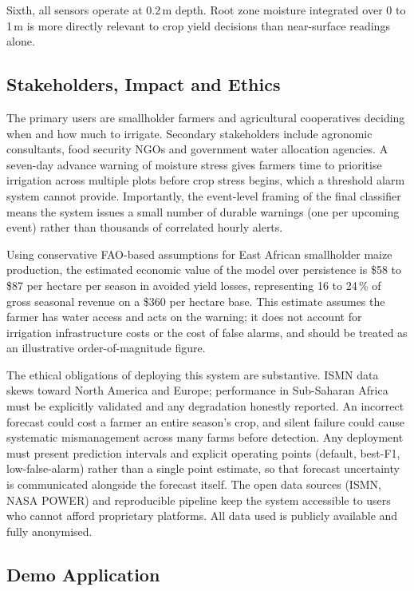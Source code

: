 \documentclass[12pt, a4paper]{article}
\begin{document}
Sixth, all sensors operate at 0.2\,m depth. Root zone moisture integrated over
0 to 1\,m is more directly relevant to crop yield decisions than near-surface
readings alone.

\subsection{Stakeholders, Impact and Ethics}

The primary users are smallholder farmers and agricultural cooperatives
deciding when and how much to irrigate. Secondary stakeholders include
agronomic consultants, food security NGOs and government water allocation
agencies. A seven-day advance warning of moisture stress gives farmers time
to prioritise irrigation across multiple plots before crop stress begins,
which a threshold alarm system cannot provide. Importantly, the event-level
framing of the final classifier means the system issues a small number of
durable warnings (one per upcoming event) rather than thousands of correlated
hourly alerts.

Using conservative FAO-based assumptions for East African smallholder maize
production, the estimated economic value of the model over persistence is
\$58 to \$87 per hectare per season in avoided yield losses, representing
16 to 24\,\% of gross seasonal revenue on a \$360 per hectare base. This
estimate assumes the farmer has water access and acts on the warning; it does
not account for irrigation infrastructure costs or the cost of false alarms,
and should be treated as an illustrative order-of-magnitude figure.

The ethical obligations of deploying this system are substantive. ISMN data
skews toward North America and Europe; performance in Sub-Saharan Africa must
be explicitly validated and any degradation honestly reported. An incorrect
forecast could cost a farmer an entire season's crop, and silent failure could
cause systematic mismanagement across many farms before detection. Any
deployment must present prediction intervals and explicit operating points
(default, best-F1, low-false-alarm) rather than a single point estimate, so
that forecast uncertainty is communicated alongside the forecast itself. The
open data sources (ISMN, NASA POWER) and reproducible pipeline keep the
system accessible to users who cannot afford proprietary platforms. All data
used is publicly available and fully anonymised.

\subsection{Demo Application}
\end{document}
